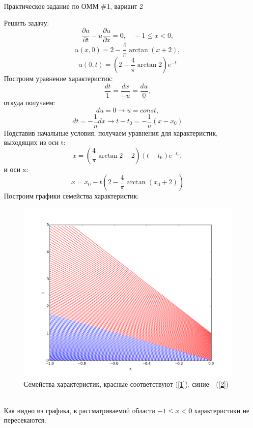 \documentclass[10pt,a4paper]{article}
\author{Будакян Ян}
\begin{document}
\begin{center}
Практическое задание по ОММ \#1, вариант 2
\end{center}
Решить задачу:
$$ \frac{\partial u}{\partial t} - u\frac{\partial u}{\partial x} = 0, \quad  -1 \leq x < 0, $$
$$u(x,0) = 2 - \frac{4}{\pi}\arctan(x+2),$$
$$u(0,t) = (2-\frac{4}{\pi}\arctan2)e^{-t}$$
Построим уравнение характеристик:
$$ \frac{dt}{1} = \frac{dx}{-u} = \frac{du}{0},$$
откуда получаем:
$$ du = 0 \rightarrow u = const,$$
$$ dt = -\frac{1}{u}dx \rightarrow t - t_0 = -\frac{1}{u}(x - x_0)$$
Подставив начальные условия, получаем уравнения для характеристик, выходящих из оси t:
\begin{equation}
x = (\frac{4}{\pi}\arctan2-2)(t-t_0)e^{-t_0},
\label{1}
\end{equation}
и оси x:
\begin{equation}
x = x_0 - t(2 - \frac{4}{\pi}\arctan(x_0+2))
\label{2}
\end{equation}
Построим графики семейства характеристик:
\begin{figure}[h]
\begin{center}
\includegraphics[scale = 0.57]{figure_1}
\caption{Семейства характеристик, красные соответствуют (\ref{1}), синие - (\ref{2})}
\end{center}
\end{figure}
\\Как видно из графика, в рассматриваемой области $ -1 \leq x < 0 $ характеристики не пересекаются.
\end{document}
